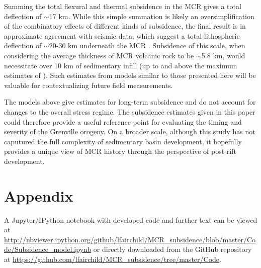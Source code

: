 \documentclass[12pt,letterpaper]{article}
\begin{document}
Summing the total flexural and thermal subsidence in the MCR gives a total deflection of $\sim$17 km. While this simple summation is likely an oversimplification of the combinatory effects of different kinds of subsidence, the final result is in approximate agreement with seismic data, which suggest a total lithospheric deflection of $\sim$20-30 km underneath the MCR \citep{Ojakangas2001a}. Subsidence of this scale, when considering the average thickness of MCR volcanic rock to be $\sim$5.8 km, would necessitate over 10 km of sedimentary infill (up to and above the maximum estimates of \cite{Ojakangas2001a}). Such estimates from models similar to those presented here will be valuable for contextualizing future field measurements.\par

The models above give estimates for long-term subsidence and do not account for changes to the overall stress regime. The subsidence estimates given in this paper could therefore provide a useful reference point for evaluating the timing and severity of the Grenville orogeny. On a broader scale, although this study has not caputured the full complexity of sedimentary basin development, it hopefully provides a unique view of MCR history through the perspective of post-rift development. 
\section*{Appendix}
A Jupyter/IPython notebook with developed code and further text can be viewed at \url{http://nbviewer.ipython.org/github/lfairchild/MCR_subsidence/blob/master/Code/Subsidence_model.ipynb} or directly downloaded from the GitHub repository at \url{https://github.com/lfairchild/MCR_subsidence/tree/master/Code}.
\end{document}
